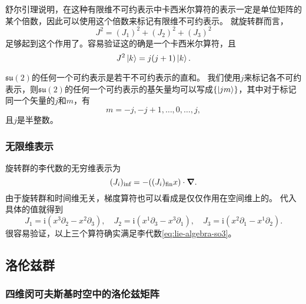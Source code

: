 \documentclass[hyperref, UTF8, a4paper]{ctexart}
\newcommand*{\ii}{\mathrm{i}}
\begin{document}
舒尔引理说明，在这种有限维不可约表示中卡西米尔算符的表示一定是单位矩阵的某个倍数，因此可以使用这个倍数来标记有限维不可约表示。
就旋转群而言，
\begin{equation}
    J^2 = (J_1)^2 + (J_2)^2 + (J_3)^2
\end{equation}
足够起到这个作用了。容易验证这的确是一个卡西米尔算符，且
\begin{equation}
    J^2 \ket{k} = j (j+1) \ket{k}.
\end{equation}

$\mathfrak{su}(2)$的任何一个可约表示是若干不可约表示的直和。
我们使用$j$来标记各不可约表示，则$\mathfrak{su}(2)$的任何一个可约表示的基矢量均可以写成$\{\ket{jm}\}$，其中对于标记同一个矢量的$j$和$m$，有
\[
    m = -j, -j+1, \ldots, 0, \ldots, j,
\]
且$j$是半整数。

\subsubsection{无限维表示}

旋转群的李代数的无穷维表示为
\[
    (J_i)_\text{inf} = - ((J_i)_\text{fin} x) \cdot \grad.
\]
由于旋转群和时间维无关，梯度算符也可以看成是仅仅作用在空间维上的。
代入具体的值就得到
\begin{equation}
    J_1 = \ii (x^3 \partial_2 - x^2 \partial_3), \quad J_2 = \ii (x^1 \partial_3 - x^3 \partial_1), \quad
    J_3 = \ii (x^2 \partial_1 - x^1 \partial_2).
    \label{eq:rotation-inf-rep}
\end{equation}
很容易验证，以上三个算符确实满足李代数\eqref{eq:lie-algebra-so3}。

\subsection{洛伦兹群}

\subsubsection{四维闵可夫斯基时空中的洛伦兹矩阵}
\end{document}
